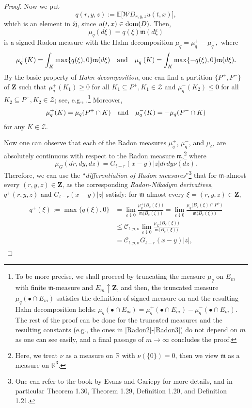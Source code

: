 \documentclass[letterpaper, 11pt,  reqno]{amsart}
\newcommand{\noi}{\noindent}
\newcommand{\R}{\mathbb{R}}
\newcommand{\bul}{\bullet}
\newcommand{\W}{\mathcal{W}}
\newcommand{\E}{\mathbb{E}}
\newcommand{\eps}{\varepsilon}
\newcommand{\s}{\sigma}
\newcommand{\fm}{\mathfrak{m}}
\newcommand{\fH}{\mathfrak{H}}
\numberwithin{equation}{section}
\numberwithin{theorem}{section}
\begin{document}
\begin{proof}
Now we put 
\[
q(r, y, z) := \E\big[ \W D_{r, y, z} u(t,x) \big], 
\]
which is an element in $\fH$, since $u(t,x) \in {\rm dom}(D)$.
Then, 
\[
\mu_q(d\xi) = q(\xi) \fm(d\xi)
\]
is a  signed Radon measure with the Hahn decomposition
$
\mu_q = \mu^+_q - \mu_q^-,
$
where
\[
\mu^+_q(K) = \int_K \max\{ q(\xi), 0 \} \fm(d\xi)
\quad
{\rm and}
\quad
\mu^-_q(K) = \int_K \max\{ - q(\xi), 0 \} \fm(d\xi).
\]
By the basic property of {\it Hahn decomposition},
one can find 
a partition $\{P^{+},  P^{-}\}$ of  $\mathbf{Z}$  such that
$\mu_q^{+}(K_1) \geq 0$ for all $K_1 \subseteq P^{+}, K_1 \in \mathcal{Z}$ and 
$\mu_q^{-}(K_2) \leq 0$ for all $K_2\subseteq P^{-}, K_2 \in \mathcal{Z}$;
see, e.g., \cite[Theorem 5.6.1]{Dudley}.\footnote{To be more precise, 
we shall  proceed by truncating the measure $\mu_q$ on  $E_m$ 
with finite $\fm$-measure and $E_m\uparrow \mathbf{Z}$, 
and then, the truncated measure $\mu_q(\bul \cap E_m)$
satisfies the definition of signed measure on \cite[page 178]{Dudley} and 
the resulting Hahn decomposition holds: 
$\mu_q(\bul \cap E_m) =
 \mu^+_q(\bul \cap E_m) - \mu^-_q(\bul \cap E_m)$.
 The rest of the proof can be done for the truncated measures and 
 the resulting constants (e.g., the ones in \eqref{Radon2}-\eqref{Radon3})
  do not depend on $m$ as one can see easily,
 and a final passage of $m\to\infty$ concludes the proof. 
}
 Moreover,
\[
\mu_q^+(K) = \mu_q(P^{+} \cap K)
\quad
{\rm and}
\quad
\mu_q^-(K) = -\mu_q(P^{-} \cap K)
\]
for any $K\in\mathcal{Z}$. 

 


Now one can observe that 
each of the Radon measures  $\mu_q^+$, $\mu_q^{-}$, and $\mu_G$ are absolutely continuous
with respect to the Radon measure $\fm$,\footnote{Here, we treat $\nu$ as a measure on $\R$
with $\nu(\{ 0\}) =0$, then we view $\fm$ as a measure on $\R^3$.}
where
\[
\mu_G(dr, dy, dz) = G_{t-r}(x-y)|z| drdy \nu(dz). 
\]
Therefore, we can use the  ``{\it differentiation of Radon measures}''\footnote{One can refer
to the book \cite{EV15} by Evans and Gariepy for more details,
and in particular Theorem 1.30, Theorem 1.29,
Definition 1.20, and Definition 1.21.}
that 
for $\fm$-almost every $(r, y, z)\in\mathbf{Z}$,
as the corresponding   {\it Radon-Nikodym derivatives},  
$q^+(r, y, z)$ and $    G_{t-r}(x-y) |z|$
 satisfy: for   $\fm$-almost every
  $\xi=(r,y,z)\in \mathbf{Z}$,
\noi
\begin{align}
\begin{aligned}
q^+(\xi) :=  \max\{q(\xi), 0 \} 
& =  \lim_{\eps\downarrow  0}
  \frac{ \mu_q^+ \big( B_{\eps}(\xi)    \big)  }{ \fm  \big( B_{\eps}(\xi)    \big) }
    =  \lim_{\eps\downarrow  0}   \frac{ \mu_q \big( B_{\eps}(\xi) \cap P^{+}  \big)   }{ \fm  \big( B_\eps(\xi)    \big) }
   \\
  &\leq \mathcal{C}_{t,p,\s} 
    \lim_{\eps\downarrow  0}
  \frac{ \mu_G \big( B_{\eps}(\xi)    \big)     }{ \fm  \big( B_{\eps}(\xi)    \big) } \\
  &=\mathcal{C}_{t,p,\s} 
    G_{t-r}(x-y) |z|,
\end{aligned}
\label{Radon2}
\end{align}


\end{proof}
\end{document}
